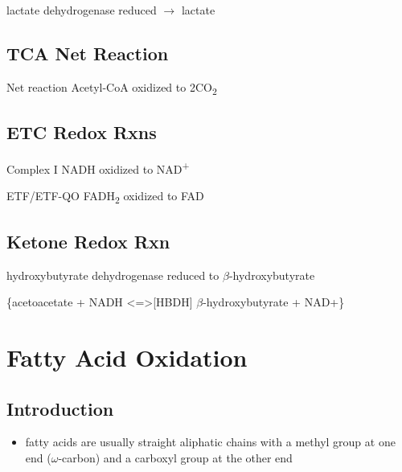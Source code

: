 \documentclass{scrartcl}
\begin{document}
\begin{description}
\item{lactate dehydrogenase} reduced \(\to\) lactate
\end{description}


\subsection{TCA Net Reaction}
\label{sec:org3174cce}
\begin{description}
\item{Net reaction} Acetyl-CoA oxidized to 2CO\textsubscript{2}
\end{description}
{\tiny{}}

\subsection{ETC Redox Rxns}
\label{sec:org9666f5f}
\begin{description}
\item{Complex I} NADH oxidized to NAD\textsuperscript{+}
\end{description}


\begin{description}
\item{ETF/ETF-QO} FADH\textsubscript{2} oxidized to FAD

\end{description}


\subsection{Ketone Redox Rxn}
\label{sec:org6535273}
\begin{description}
\item{hydroxybutyrate dehydrogenase} reduced to \(\beta\)-hydroxybutyrate

\ce\{acetoacetate + NADH <=>[HBDH] \(\beta\)-hydroxybutyrate + NAD+\}
\end{description}

\section{Fatty Acid Oxidation}
\label{sec:orgfa67902}
\subsection{Introduction}
\label{sec:orga6f404f}
\begin{itemize}
\item fatty acids are usually straight aliphatic chains with a methyl
group at one end (\(\omega\)-carbon) and a carboxyl group at the other
end
\end{itemize}
\end{document}
